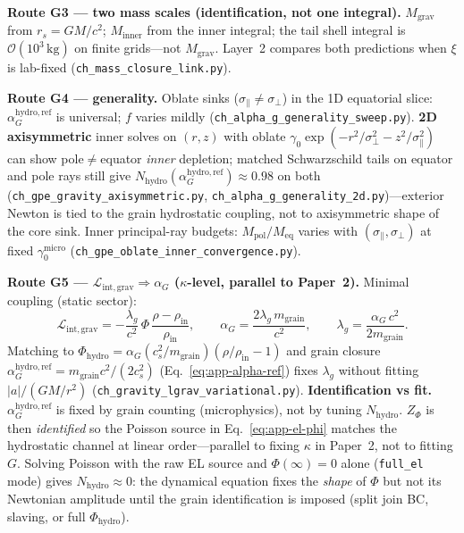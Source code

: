 \documentclass[11pt,a4paper]{article}
\begin{document}
\textbf{Route G3 --- two mass scales (identification, not one integral).}
$M_{\mathrm{grav}}$ from $r_s = GM/c^2$; $M_{\mathrm{inner}}$ from the inner integral; the tail shell integral is $\mathcal{O}(10^3\,\mathrm{kg})$ on finite grids---not $M_{\mathrm{grav}}$.
Layer~2 compares both predictions when $\xi$ is lab-fixed (\texttt{ch\_mass\_closure\_link.py}).

\textbf{Route G4 --- generality.}
Oblate sinks ($\sigma_\parallel \neq \sigma_\perp$) in the 1D equatorial slice: $\alpha_G^{\mathrm{hydro,ref}}$ is universal; $f$ varies mildly (\texttt{ch\_alpha\_g\_generality\_sweep.py}).
\textbf{2D axisymmetric} inner solves on $(r,z)$ with oblate $\gamma_0 \exp(-r^2/\sigma_\perp^2 - z^2/\sigma_\parallel^2)$ can show pole$\neq$equator \emph{inner} depletion; matched Schwarzschild tails on equator and pole rays still give $N_{\mathrm{hydro}}(\alpha_G^{\mathrm{hydro,ref}}) \approx 0.98$ on both (\texttt{ch\_gpe\_gravity\_axisymmetric.py}, \texttt{ch\_alpha\_g\_generality\_2d.py})---exterior Newton is tied to the grain hydrostatic coupling, not to axisymmetric shape of the core sink.
Inner principal-ray budgets: $M_{\mathrm{pol}}/M_{\mathrm{eq}}$ varies with $(\sigma_\parallel,\sigma_\perp)$ at fixed $\gamma_0^{\mathrm{micro}}$ (\texttt{ch\_gpe\_oblate\_inner\_convergence.py}).

\textbf{Route G5 --- $\mathcal{L}_{\mathrm{int,grav}} \Rightarrow \alpha_G$ ($\kappa$-level, parallel to Paper~2).}
Minimal coupling (static sector):
\begin{equation}
  \mathcal{L}_{\mathrm{int,grav}} = -\frac{\lambda_g}{c^2}\,\Phi\,\frac{\rho - \rho_{\mathrm{in}}}{\rho_{\mathrm{in}}},
  \qquad
  \alpha_G = \frac{2\lambda_g\, m_{\mathrm{grain}}}{c^2},
  \qquad
  \lambda_g = \frac{\alpha_G\, c^2}{2 m_{\mathrm{grain}}}.
  \label{eq:app-lgrav-int}
\end{equation}
Matching to $\Phi_{\mathrm{hydro}} = \alpha_G (c_s^2/m_{\mathrm{grain}})(\rho/\rho_{\mathrm{in}}-1)$ and grain closure $\alpha_G^{\mathrm{hydro,ref}} = m_{\mathrm{grain}} c^2/(2c_s^2)$ (Eq.~\ref{eq:app-alpha-ref}) fixes $\lambda_g$ without fitting $|a|/(GM/r^2)$ (\texttt{ch\_gravity\_lgrav\_variational.py}).
\textbf{Identification vs fit.}
$\alpha_G^{\mathrm{hydro,ref}}$ is fixed by grain counting (microphysics), not by tuning $N_{\mathrm{hydro}}$.
$Z_\Phi$ is then \emph{identified} so the Poisson source in Eq.~\ref{eq:app-el-phi} matches the hydrostatic channel at linear order---parallel to fixing $\kappa$ in Paper~2, not to fitting $G$.
Solving Poisson with the raw EL source and $\Phi(\infty)=0$ alone (\texttt{full\_el} mode) gives $N_{\mathrm{hydro}}\approx 0$: the dynamical equation fixes the \emph{shape} of $\Phi$ but not its Newtonian amplitude until the grain identification is imposed (split join BC, slaving, or full $\Phi_{\mathrm{hydro}}$).
\end{document}
